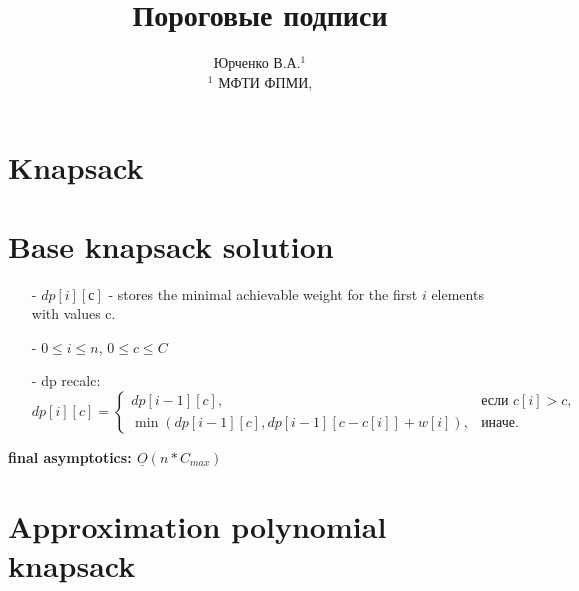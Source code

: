 \documentclass[a4paper,12pt]{extarticle}
\title{Пороговые подписи}
\author{ Юрченко В.А.$^{1}$\\
	$^{1}$ МФТИ ФПМИ,	\\	
}
\begin{document}
\section*{Knapsack}


\section*{Base knapsack solution}

\begin{itemize}
	\item[-] $dp[i][с]$ - stores the minimal achievable weight for the first $i$ elements with values c.
	\item[-] $0 \leq i \leq n$, $0 \leq c \leq C$ 
	\item[-] dp recalc: \\
	\[
	dp[i][c] =
	\begin{cases} 
	dp[i-1][c], & \text{если } c[i] > c, \\
	\min\left(dp[i-1][c], dp[i-1][c - c[i]] + w[i]\right), & \text{иначе}.
	\end{cases}
	\]

\end{itemize}

\textbf{final asymptotics: $\underline{O}(n * C_{max})$}

\section*{Approximation polynomial knapsack}
\end{document}
